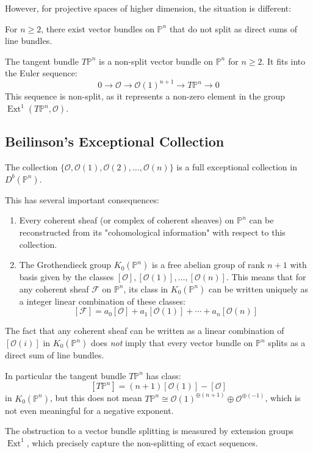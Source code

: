 \documentclass[12pt]{article}
\begin{document}
However, for projective spaces of higher dimension, the situation is different:

\begin{theorem}
    For $n \geq 2$, there exist vector bundles on $\mathbb{P}^n$ that do not split as direct sums of line bundles.
\end{theorem}

\begin{example}
    The tangent bundle $T\mathbb{P}^n$ is a non-split vector bundle on $\mathbb{P}^n$ for $n \geq 2$. It fits into the Euler sequence:
    \[
        0 \to \mathcal{O} \to \mathcal{O}(1)^{n+1} \to T\mathbb{P}^n \to 0
    \]
    This sequence is non-split, as it represents a non-zero element in the group $\operatorname{Ext}^1(T\mathbb{P}^n, \mathcal{O})$.
\end{example}

\subsection{Beilinson's Exceptional Collection}

\begin{theorem}[Beilinson]
    The collection $\{\mathcal{O}, \mathcal{O}(1), \mathcal{O}(2), \ldots, \mathcal{O}(n)\}$ is a full exceptional collection in $D^b(\mathbb{P}^n)$.
\end{theorem}


This has several important consequences:
\begin{enumerate}
    \item Every coherent sheaf (or complex of coherent sheaves) on $\mathbb{P}^n$ can be reconstructed from its "cohomological information" with respect to this collection.

    \item The Grothendieck group $K_0(\mathbb{P}^n)$ is a free abelian group of rank $n+1$ with basis given by the classes $[\mathcal{O}], [\mathcal{O}(1)], \ldots, [\mathcal{O}(n)]$. This means that for any coherent sheaf $\mathcal{F}$ on $\mathbb{P}^n$, its class in $K_0(\mathbb{P}^n)$ can be written uniquely as a integer linear combination of these classes:
          \[
              [\mathcal{F}] = a_0[\mathcal{O}] + a_1[\mathcal{O}(1)] + \cdots + a_n[\mathcal{O}(n)]
          \]
\end{enumerate}


\begin{remark}
    The fact that any coherent sheaf can be written as a linear combination of $[\mathcal{O}(i)]$ in $K_0(\mathbb{P}^n)$ does \textit{not} imply that every vector bundle on $\mathbb{P}^n$ splits as a direct sum of line bundles.


    In particular the tangent bundle $T\mathbb{P}^n$ has class:
    \[
        [T\mathbb{P}^n] = (n+1)[\mathcal{O}(1)] - [\mathcal{O}]
    \]
    in $K_0(\mathbb{P}^n)$, but this does not mean $T\mathbb{P}^n \cong \mathcal{O}(1)^{\oplus (n+1)} \oplus \mathcal{O}^{\oplus (-1)}$, which is not even meaningful for a negative exponent.

    The obstruction to a vector bundle splitting is measured by extension groups $\operatorname{Ext}^1$, which precisely capture the non-splitting of exact sequences.
\end{remark}
\end{document}
